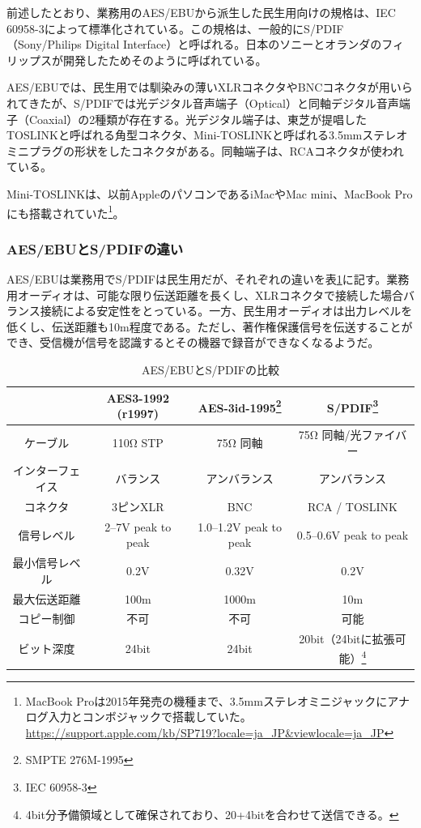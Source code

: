 前述したとおり、業務用のAES/EBUから派生した民生用向けの規格は、IEC 60958-3によって標準化されている。この規格は、一般的にS/PDIF（Sony/Philips Digital Interface）と呼ばれる。日本のソニーとオランダのフィリップスが開発したためそのように呼ばれている。

AES/EBUでは、民生用では馴染みの薄いXLRコネクタやBNCコネクタが用いられてきたが、S/PDIFでは光デジタル音声端子（Optical）と同軸デジタル音声端子（Coaxial）の2種類が存在する。光デジタル端子は、東芝が提唱したTOSLINKと呼ばれる角型コネクタ、Mini-TOSLINKと呼ばれる3.5mmステレオミニプラグの形状をしたコネクタがある。同軸端子は、RCAコネクタが使われている。

Mini-TOSLINKは、以前AppleのパソコンであるiMacやMac mini、MacBook Proにも搭載されていた\footnote{MacBook Proは2015年発売の機種まで、3.5mmステレオミニジャックにアナログ入力とコンボジャックで搭載していた。 \url{https://support.apple.com/kb/SP719?locale=ja_JP&viewlocale=ja_JP}}。

\subsubsection{AES/EBUとS/PDIFの違い}

AES/EBUは業務用でS/PDIFは民生用だが、それぞれの違いを表\ref{tab:compare}に記す。業務用オーディオは、可能な限り伝送距離を長くし、XLRコネクタで接続した場合バランス接続による安定性をとっている。一方、民生用オーディオは出力レベルを低くし、伝送距離も10m程度である。ただし、著作権保護信号を伝送することができ、受信機が信号を認識するとその機器で録音ができなくなるようだ。

\begin{table}[htb]
  \begin{minipage}{\textwidth}
    \label{tab:compare}
    \caption{AES/EBUとS/PDIFの比較\cite{aesebuandspdif}}
    \begin{tabular}{c|ccc} \hline
      & AES3-1992 (r1997) & AES-3id-1995\footnote{SMPTE 276M-1995} & S/PDIF\footnote{IEC 60958-3} \\ \hline
      ケーブル & 110Ω STP & 75Ω 同軸 & 75Ω 同軸/光ファイバー \\
      インターフェイス & バランス & アンバランス & アンバランス \\
      コネクタ & 3ピンXLR & BNC & RCA / TOSLINK \\
      信号レベル & 2--7V peak to peak & 1.0--1.2V peak to peak & 0.5--0.6V peak to peak \\
      最小信号レベル & 0.2V & 0.32V & 0.2V \\
      最大伝送距離 & 100m & 1000m & 10m \\
      コピー制御 & 不可 & 不可 & 可能 \\
      ビット深度 & 24bit & 24bit & 20bit（24bitに拡張可能）\footnote{4bit分予備領域として確保されており、20+4bitを合わせて送信できる。} \\
    \end{tabular}
  \end{minipage}
\end{table}

